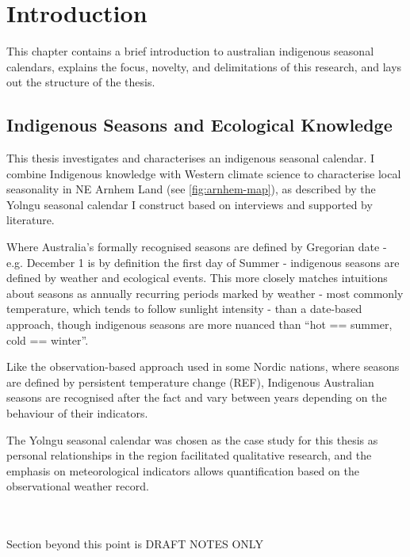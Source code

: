 \chapter{Introduction}
This chapter contains a brief introduction to australian indigenous seasonal calendars,
explains the focus, novelty, and delimitations of this research,
and lays out the structure of the thesis.


\section{Indigenous Seasons and Ecological Knowledge}


This thesis investigates and characterises an indigenous seasonal calendar.
I combine Indigenous knowledge with Western climate science to characterise
local seasonality in NE Arnhem Land (see \autoref{fig:arnhem-map}),
as described by the Yolngu seasonal calendar I construct based on
interviews and supported by literature.


Where Australia's formally recognised seasons are defined by Gregorian date -
e.g. December 1 is by definition the first day of Summer - indigenous seasons
are defined by weather and ecological events.
%
This more closely matches intuitions about seasons as annually recurring
periods marked by weather - most commonly temperature, which tends to
follow sunlight intensity - than a date-based approach, though indigenous
seasons are more nuanced than ``hot == summer, cold == winter''.

Like the observation-based approach used in some Nordic nations, where
seasons are defined by persistent temperature change (REF),
Indigenous Australian seasons are recognised after the fact and vary
between years depending on the behaviour of their indicators.


The Yolngu seasonal calendar was chosen as the case study for this thesis
as personal relationships in the region facilitated qualitative research,
and the emphasis on meteorological indicators allows quantification based
on the observational weather record.
    


~\\
~\\
Section beyond this point is DRAFT NOTES ONLY



